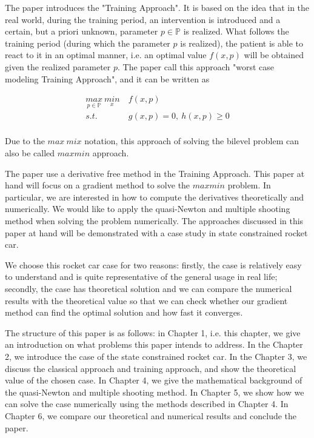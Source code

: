 The paper \cite{MatSch22} introduces the "Training Approach".  It is based on the idea that in the real world, during the training period, an intervention is introduced and a certain, but a priori unknown, parameter $p \in \mathbb{P}$ is realized. What follows the training period (during which the parameter $p$ is realized), the patient is able to react to it in an optimal manner, i.e. an optimal value $f(x,p)$ will be obtained given the  realized parameter $p$. The paper \cite{MatSch22} call this approach "worst case modeling Training Approach", and it can be written as 

\begin{equation}
	\begin{aligned}
		\underset{p \in \mathbb{P}}{max} \ \underset{x}{min} & \  f(x,p) \\ 
		s.t.  & \  g(x, p) = 0, \  h(x,p)  \geq  0 \\
	\end{aligned}
\end{equation}

Due to the $max \ mix$ notation, this approach of solving the bilevel problem can also be called $max min$ approach. 

The paper \cite{MatSch22} use a derivative free method in the Training Approach. This paper at hand will focus on a gradient method to solve the $maxmin$ problem.  In particular, we are interested in how to compute the derivatives theoretically and numerically.  We would like to apply the quasi-Newton and multiple shooting method when solving the problem numerically. The approaches discussed in this paper at hand will be demonstrated with a case study in state constrained rocket car. 

We choose this rocket car case for two reasons: firstly, the case is relatively easy to understand and is quite representative of the general usage in real life; secondly, the case has theoretical solution and we can compare the numerical results with the theoretical value so that we can check whether our gradient method can find the optimal solution and how fast it converges. 
 
The structure of this paper is as follows: in Chapter 1, i.e. this chapter,  we give an introduction on what problems this paper intends to address. In the Chapter 2, we introduce the case of the state constrained rocket car. In the Chapter 3, we discuss the classical approach and training approach, and show the theoretical value of the chosen case. In Chapter 4, we give the mathematical background of the quasi-Newton and multiple shooting method. In Chapter 5, we show how we can solve the case numerically using the methods described in Chapter 4. In Chapter 6, we compare our theoretical and numerical results and conclude the paper. 







